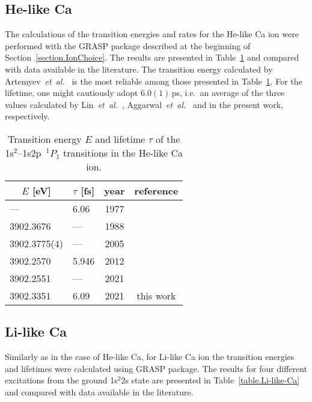\subsection{He-like Ca}
\label{section.He-like-Ca}
The calculations of the transition energies and rates for the He-like Ca ion were performed with the {\sf GRASP} package described at the beginning of Section~\ref{section.IonChoice}.  The results are presented in Table~\ref{table.He-like-Ca} and compared with data available in the literature.  The transition energy calculated by Artemyev~\textit{et~al.}~\cite{Artemyev:2005} is the most reliable among those presented in 
Table~\ref{table.He-like-Ca}.  For the lifetime, one might cautiously adopt $ 6.0(1)$\,ps, i.e.\ an average of the three values calculated by Lin~\textit{et~al.}~\cite{LinJohnsonDalgarno:1977}, Aggarwal~\textit{et~al.}~\cite{Aggarwal:2012} and in the present work, respectively.

\begin{table}[htbp!]\centering
    \caption{\normalsize{Transition energy $E$ and lifetime $\tau$ of the 1s$^2$--1s2p~$^1 \! P_1$ transitions in the He-like Ca ion.}}
    \begin{tabular}{llcc}
    \hline\hline
    \multicolumn{1}{c}{$E$ [eV]\phantom{ene}} & 
    \multicolumn{1}{c}{$\tau$ [fs]\phantom{en}} & year & reference \\
    \hline 
    \phantom{390} 
    ---       & 6.06  & 1977 & \cite{LinJohnsonDalgarno:1977} \\
    3902.3676    & ---   & 1988 & \cite{Drake:1988} \\
    3902.3775(4) & ---   & 2005 & \cite{Artemyev:2005} \\
    3902.2570    & 5.946 & 2012 & \cite{Aggarwal:2012} \\
    3902.2551    & ---   & 2021 & \cite{NIST-ASD} \\
    3902.3351    & 6.09  & 2021 & this work \\
    \hline\hline
\end{tabular}
\label{table.He-like-Ca}
\end{table}

\subsection{Li-like Ca}
\label{section.Li-like-Ca}

Similarly as in the case of He-like Ca, for Li-like Ca ion the transition energies and lifetimes were calculated using {\sf GRASP} package.  The results for four different excitations from the ground {1s$^2$2s} state are presented in Table~\ref{table.Li-like-Ca} and compared with data available in the literature.

